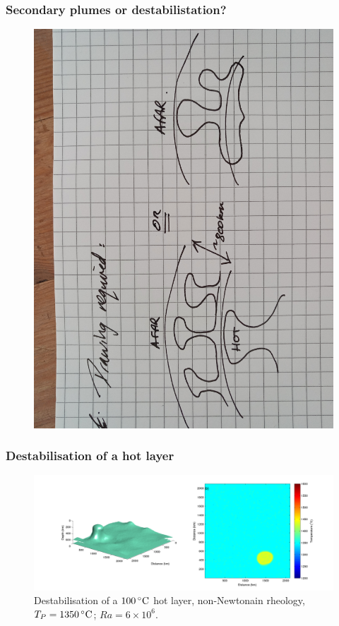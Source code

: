 \documentclass[aspectratio=169]{beamer}
\begin{document}
\begin{frame}
    \frametitle{Secondary plumes or destabilistation?}
    \begin{figure}
        \includegraphics[height=0.8\paperheight, angle=270]{./pictures/temporary-drawing-1.jpg}
    \end{figure}
\end{frame}

\begin{frame}
    \frametitle{Destabilisation of a hot layer}
    \begin{figure}
        \vspace{-.5cm}
        \includegraphics[width=0.85\paperwidth]{./figures/100hot/100hotbase_1.png}
        \caption{Destabilisation of a $100\rm\,^{\circ}C$ hot layer, non-Newtonain rheology, $T_{P}=1350\rm\,^{\circ}C$; $Ra = 6\times10^{6}$.}
    \end{figure}
\end{frame}
\end{document}
